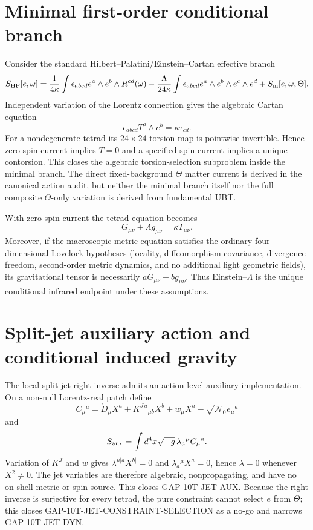 \documentclass[11pt,a4paper]{article}
\begin{document}
\section{Minimal first-order conditional branch}
Consider the standard Hilbert--Palatini/Einstein--Cartan effective branch
\[
 S_{\rm HP}[e,\omega]
 =\frac1{4\kappa}\int\epsilon_{abcd}e^a\wedge e^b\wedge R^{cd}(\omega)
 -\frac{\Lambda}{24\kappa}\int\epsilon_{abcd}e^a\wedge e^b\wedge e^c\wedge e^d
 +S_{\rm m}[e,\omega,\Theta].
\]
Independent variation of the Lorentz connection gives the algebraic Cartan
equation
\[
 \epsilon_{abcd}T^a\wedge e^b=\kappa\tau_{cd}.
\]
For a nondegenerate tetrad its $24\times24$ torsion map is pointwise
invertible.  Hence zero spin current implies $T=0$ and a specified spin current
implies a unique contorsion.  This closes the algebraic torsion-selection
subproblem inside the minimal branch.  The direct fixed-background
$\Theta$ matter current is derived in the canonical action audit, but neither
the minimal branch itself nor the full composite $\Theta$-only variation is
derived from fundamental UBT.

With zero spin current the tetrad equation becomes
\[
 G_{\mu\nu}+\Lambda g_{\mu\nu}=\kappa T_{\mu\nu}.
\]
Moreover, if the macroscopic metric equation satisfies the ordinary
four-dimensional Lovelock hypotheses (locality, diffeomorphism covariance,
divergence freedom, second-order metric dynamics, and no additional light
geometric fields), its gravitational tensor is necessarily
$aG_{\mu\nu}+bg_{\mu\nu}$.  Thus Einstein--$\Lambda$ is the unique conditional
infrared endpoint under these assumptions.

\section{Split-jet auxiliary action and conditional induced gravity}
The local split-jet right inverse admits an action-level auxiliary
implementation.  On a non-null Lorentz-real patch define
\[
 C_\mu{}^a=\mathring D_\mu X^a+K^{J\,a}{}_{\mu b}X^b+w_\mu X^a
 -\sqrt{\mathcal N_0}e_\mu{}^a
\]
and
\[
 S_{\rm aux}=\int d^4x\sqrt{-g}\,\lambda_a{}^\mu C_\mu{}^a.
\]
Variation of $K^J$ and $w$ gives
$\lambda^{\mu[a}X^{b]}=0$ and $\lambda_a{}^\mu X^a=0$, hence
$\lambda=0$ whenever $X^2\ne0$.  The jet variables are therefore algebraic,
nonpropagating, and have no on-shell metric or spin source.  This closes
GAP-10T-JET-AUX.  Because the right inverse is surjective for every tetrad,
the pure constraint cannot select $e$ from $\Theta$; this closes
GAP-10T-JET-CONSTRAINT-SELECTION as a no-go and narrows GAP-10T-JET-DYN.
\end{document}
